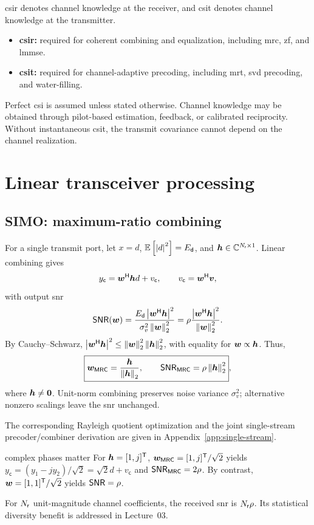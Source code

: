 \Ac{csir} denotes channel knowledge at the receiver, and \ac{csit} denotes channel knowledge at the transmitter.
\begin{itemize}
	\item \textbf{\acs{csir}:} required for coherent combining and equalization, including \ac{mrc}, \ac{zf}, and \ac{lmmse}.
	\item \textbf{\acs{csit}:} required for channel-adaptive precoding, including \ac{mrt}, \ac{svd} precoding, and water-filling.
\end{itemize}
Perfect \ac{csi} is assumed unless stated otherwise. Channel knowledge may be obtained through pilot-based estimation, feedback, or calibrated reciprocity. Without instantaneous \ac{csit}, the transmit covariance cannot depend on the channel realization.


\section{Linear transceiver processing}\label{sec:linear}

\subsection{SIMO: maximum-ratio combining}
For a single transmit port, let $x=d$, $\mathbb{E}\left[\left|d\right|^2\right]=E_{\mathsf{d}}$, and
$\bm{h}\in\mathbb{C}^{N_{\mathsf{r}}\times1}$. Linear combining gives
\begin{equation*}
	y_{\mathsf c}={\bm{w}}^{\mathsf{H}}\bm{h}d+v_{\mathsf c},
	\qquad v_{\mathsf c}={\bm{w}}^{\mathsf{H}}\bm{v},
\end{equation*}
with output \ac{snr}
\begin{equation}
	\mathsf{SNR}(\bm{w})
	=\frac{E_{\mathsf{d}}\left|{\bm{w}}^{\mathsf{H}}\bm{h}\right|^2}
	{\sigma_v^2\left\|\bm{w}\right\|_2^2} = \rho \frac{\left|{\bm{w}}^{\mathsf{H}}\bm{h}\right|^2}
	{\left\|\bm{w}\right\|_2^2}  .
\end{equation}
By Cauchy--Schwarz,
$\left|{\bm{w}}^{\mathsf{H}}\bm{h}\right|^2\leq
\left\|\bm{w}\right\|_2^2\left\|\bm{h}\right\|_2^2$,
with equality for $\bm{w}\propto\bm{h}$. Thus,
\begin{equation}\label{eq:mrc}
	\boxed{\bm{w}_{\mathsf{MRC}}=\frac{\bm{h}}{\left\|\bm{h}\right\|_2},
		\qquad \mathsf{SNR}_{\mathsf{MRC}}=\rho\left\|\bm{h}\right\|_2^2},
\end{equation}
where $\bm{h}\ne\bm{0}$. Unit-norm combining preserves noise
variance $\sigma_v^2$; alternative nonzero scalings leave the
\ac{snr} unchanged.

The corresponding Rayleigh quotient optimization
and the joint single-stream precoder/combiner
derivation are given in
Appendix~\ref{app:single-stream}.
\begin{example}{complex phases matter}
	For $\bm{h}=[1,j]^{\mathsf T}$,
	$\bm{w}_{\mathsf{MRC}}=[1,j]^{\mathsf T}/\sqrt{2}$ yields
	$y_{\mathsf c}=(y_1-jy_2)/\sqrt{2}=\sqrt{2}d+v_{\mathsf c}$
	and $\mathsf{SNR}_{\mathsf{MRC}}=2\rho$. By contrast,
	$\bm{w}=[1,1]^{\mathsf T}/\sqrt{2}$ yields $\mathsf{SNR}=\rho$.
\end{example}
For $N_{\mathsf{r}}$ unit-magnitude channel coefficients, the received
\ac{snr} is $N_{\mathsf{r}}\rho$. Its statistical diversity benefit is
addressed in Lecture~03.

